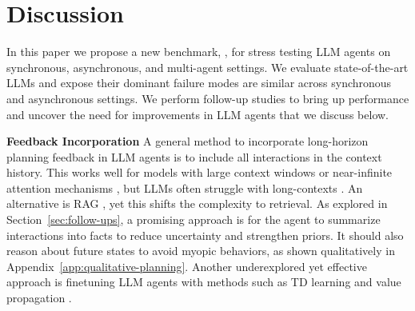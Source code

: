 \vspace{-1em}
\section{Discussion}
\vspace{-1em}

In this paper we propose a new benchmark, \robotouille{}, for stress testing LLM agents on synchronous, asynchronous, and multi-agent settings. We evaluate state-of-the-art LLMs and expose their dominant failure modes are similar across synchronous and asynchronous settings. We perform follow-up studies to bring up performance and uncover the need for improvements in LLM agents that we discuss below. 

\textbf{Feedback Incorporation}
\label{dis:feedback}
A general method to incorporate long-horizon planning feedback in LLM agents is to include all interactions in the context history. This works well for models with large context windows or near-infinite attention mechanisms \citep{liu2023ringattentionblockwisetransformers,munkhdalai2024leavecontextbehindefficient}, but LLMs often struggle with long-contexts \citep{liu2023lostmiddlelanguagemodels}. An alternative is RAG \citep{lewis2021retrievalaugmentedgenerationknowledgeintensivenlp}, yet this shifts the complexity to retrieval. As explored in Section~\ref{sec:follow-ups}, a promising approach is for the agent to summarize interactions into facts to reduce uncertainty and strengthen priors. It should also reason about future states to avoid myopic behaviors, as shown qualitatively in Appendix~\ref{app:qualitative-planning}. Another underexplored yet effective approach is finetuning LLM agents \citep{chen2023fireactlanguageagentfinetuning} with methods such as TD learning and value propagation \citep{putta2024agentqadvancedreasoning, gehring2024rlefgroundingcodellms}.


